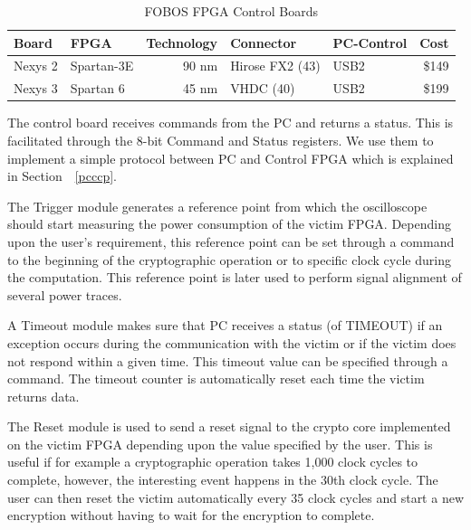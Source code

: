 \documentclass{llncs}
\numberwithin{algorithm}{chapter}
\begin{document}
\begin{table}[ht]%
  \centering%
  \caption{FOBOS FPGA Control Boards}%
  \label{tab:fobos-cntrlbd}%
  \begin{tabular}{|l|l|r|l|l|r|}\hline
  {Board}      & {FPGA}       & {Technology}  & {Connector} & {PC-Control} & {Cost}\\ \hline
  Nexys 2    & Spartan-3E & 90 nm       & Hirose FX2 (43) & USB2       &\$149\\ 
  Nexys 3    & Spartan 6  & 45 nm       & VHDC (40)       & USB2       &\$199\\ \hline
  \end{tabular}%
  \vspace{-2ex}%
\end{table}

The control board receives commands from the PC and returns a status. This is facilitated
through the 8-bit Command and Status registers. We use them to implement a simple 
protocol between PC and Control FPGA which is explained in Section \,~\ref{pcccp}. 

The Trigger module generates a reference point from which the oscilloscope should 
start measuring the power consumption of the victim FPGA. Depending upon the
user's requirement, this reference point can be set through a command to the 
beginning of the cryptographic operation or to specific clock cycle during the computation. 
This reference point is later used to perform signal alignment of several power traces.

A Timeout module makes sure that PC receives a status (of TIMEOUT) if an exception occurs 
during the communication with the victim or if the victim does not respond within a given 
time. This timeout value can be specified through a command. The timeout counter is
automatically reset each time the victim returns data.

The Reset module is used to send a reset signal to the crypto core implemented on the victim FPGA
depending upon the value specified by the user. This is useful if for example a cryptographic
operation takes 1,000 clock cycles to complete, however, the interesting event happens in the
30th clock cycle. The user can then reset the victim automatically every 35 clock cycles
and start a new encryption without having to wait for the encryption to complete.
\end{document}
